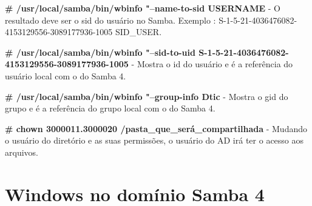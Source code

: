 \noindent \textbf{\# /usr/local/samba/bin/wbinfo "--name-to-sid USERNAME} - O resultado deve ser o sid do usuário no Samba. Exemplo : S-1-5-21-4036476082-4153129556-3089177936-1005 SID\_USER.

\noindent \textbf{\# /usr/local/samba/bin/wbinfo "--sid-to-uid S-1-5-21-4036476082-4153129556-3089177936-1005} - Mostra o id do usuário e é a referência do usuário local com o do Samba 4.

\noindent \textbf{\# /usr/local/samba/bin/wbinfo "--group-info Dtic} - Mostra o gid do grupo e é a referência do grupo local com o do Samba 4.

\noindent \textbf{\# chown 3000011.3000020 /pasta\_que\_será\_compartilhada} - Mudando o usuário do diretório e as suas permissões, o usuário do AD irá ter o acesso aos arquivos.






\section{Windows no domínio Samba 4}


